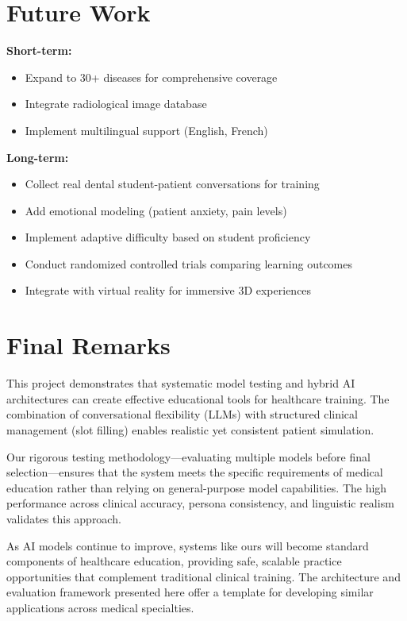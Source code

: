 \documentclass[runningheads,a4paper,11pt]{report}
\begin{document}
\section{Future Work}

\textbf{Short-term:}
\begin{itemize}
\item Expand to 30+ diseases for comprehensive coverage
\item Integrate radiological image database
\item Implement multilingual support (English, French)
\end{itemize}

\textbf{Long-term:}
\begin{itemize}
\item Collect real dental student-patient conversations for training
\item Add emotional modeling (patient anxiety, pain levels)
\item Implement adaptive difficulty based on student proficiency
\item Conduct randomized controlled trials comparing learning outcomes
\item Integrate with virtual reality for immersive 3D experiences
\end{itemize}

\section{Final Remarks}

This project demonstrates that systematic model testing and hybrid AI architectures can create effective educational tools for healthcare training. The combination of conversational flexibility (LLMs) with structured clinical management (slot filling) enables realistic yet consistent patient simulation.

Our rigorous testing methodology—evaluating multiple models before final selection—ensures that the system meets the specific requirements of medical education rather than relying on general-purpose model capabilities. The high performance across clinical accuracy, persona consistency, and linguistic realism validates this approach.

As AI models continue to improve, systems like ours will become standard components of healthcare education, providing safe, scalable practice opportunities that complement traditional clinical training. The architecture and evaluation framework presented here offer a template for developing similar applications across medical specialties.
\end{document}
